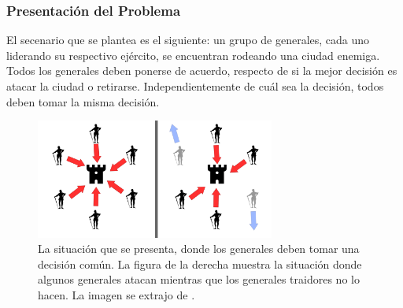 \subsubsection*{Presentación del Problema}

El secenario que se plantea es el siguiente: un grupo de generales, cada uno liderando su respectivo ejército, se encuentran rodeando una ciudad enemiga. Todos los generales deben ponerse de acuerdo, respecto de si la mejor decisión es atacar la ciudad o retirarse. Independientemente de cuál sea la decisión, todos deben tomar la misma decisión. 


\begin{figure}[H]
    \centering
    \includegraphics[width=0.7\textwidth]{img/Byzantine_Generals_Problem.png}
    \caption{La situación que se presenta, donde los generales deben tomar una decisión común. La figura de la derecha muestra la situación donde algunos generales atacan mientras que los generales traidores no lo hacen. La imagen se extrajo de \cite{wikipedia-contributors-2023}.}
    \label{fig:Byzantine_Generales_Problem}    
\end{figure}


